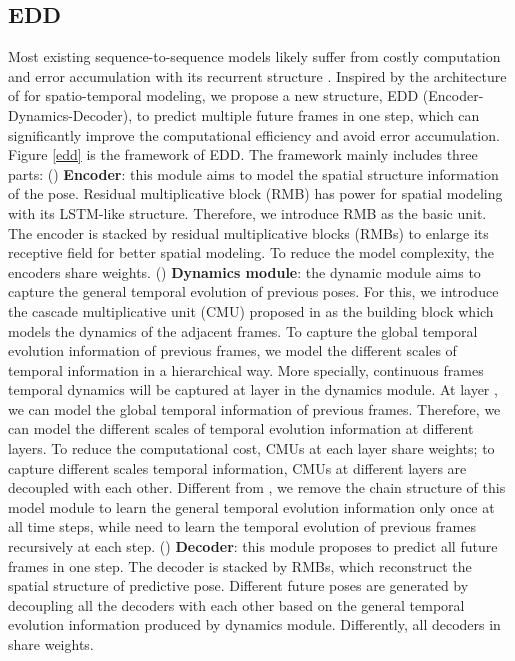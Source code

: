 \documentclass[journal]{IEEEtran}
\begin{document}
\subsection{EDD}
Most existing sequence-to-sequence models likely suffer from costly computation and error accumulation with its recurrent structure \cite{predcnn,MartinezOMP,Guifewshot,fstvp}. Inspired by the architecture of \cite{predcnn} for spatio-temporal modeling, we propose a new structure, EDD (Encoder-Dynamics-Decoder), to predict multiple future frames in one step, which can significantly improve the computational efficiency and avoid error accumulation. Figure \ref{edd} is the framework of EDD. The framework mainly includes three parts: () {\bf Encoder}: this module aims to model the spatial structure information of the pose. Residual multiplicative block (RMB) \cite{vpn} has power for spatial modeling with its LSTM-like structure. Therefore, we introduce RMB as the basic unit. The encoder is stacked by  residual multiplicative blocks (RMBs) to enlarge its receptive field for better spatial modeling. To reduce the model complexity, the encoders share weights. () {\bf Dynamics module}: the dynamic module aims to capture the general temporal evolution of previous poses. For this, we introduce the cascade multiplicative unit (CMU) proposed in \cite{predcnn} as the building block which models the dynamics of the adjacent frames. To capture the global temporal evolution information of previous frames, we model the different scales of temporal information in a hierarchical way. More specially,  continuous frames temporal dynamics will be captured at layer  in the dynamics module. At layer , we can model the global temporal information of previous  frames. Therefore, we can model the different scales of temporal evolution information at different layers. To reduce the computational cost, CMUs at each layer share weights; to capture different scales temporal information, CMUs at different layers are decoupled with each other. Different from \cite{predcnn}, we remove the chain structure of this model module to learn the general temporal evolution information only once at all time steps, while \cite{predcnn} need to learn the temporal evolution of previous frames recursively at each step. () {\bf Decoder}: this module proposes to predict all future frames in one step. The decoder is stacked by  RMBs, which reconstruct the spatial structure of predictive pose. Different future poses are generated by decoupling all the decoders with each other based on the general temporal evolution information produced by dynamics module. Differently, all decoders in \cite{predcnn} share weights.
\end{document}
